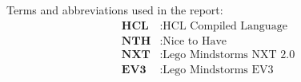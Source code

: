 
Terms and abbreviations used in the report:
\begin{align*}
	\textbf{HCL} &: \text{HCL Compiled Language} \\
    \textbf{NTH} &: \text{Nice to Have} \\
    \textbf{NXT} &: \text{Lego Mindstorms NXT 2.0} \\
    \textbf{EV3} &: \text{Lego Mindstorms EV3} \\   
\end{align*}